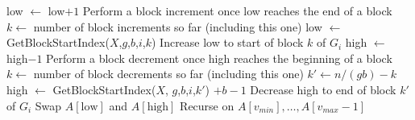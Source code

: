 \documentclass[twoside,leqno,twocolumn]{article}
\begin{document}
\begin{figure*}
\begin{algorithmic}
              \State low $\gets$ low$+1$
                \Comment Perform a block increment once low reaches the end of a block
                \State $k \gets $ number of block increments so far (including this one)
                \State low $\gets$ GetBlockStartIndex($X$,$g$,$b$,$i$,$k$)
                \Comment Increase low to start of block $k$ of $G_i$
              \EndIf
            \EndWhile
              \State high $\gets$ high$-1$
                \Comment Perform a block decrement once high reaches the beginning of a block
                \State $k \gets $ number of block decrements so far (including this one)
                \State $k' \gets n/(gb) - k$
                \State high $\gets$ GetBlockStartIndex($X$, $g$,$b$,$i$,$k'$) $+b-1$
                \Comment Decrease high to end of block $k'$ of $G_i$
              \EndIf
            \EndWhile
            \State Swap $A[\text{low}]$ and $A[\text{high}]$
          \EndWhile
        \EndFor
        \State Recurse on $A[v_{min}],\ldots,A[v_{max}-1]$
      \EndIf
    \EndProcedure
  \end{algorithmic}	
\end{figure*}
\end{document}
